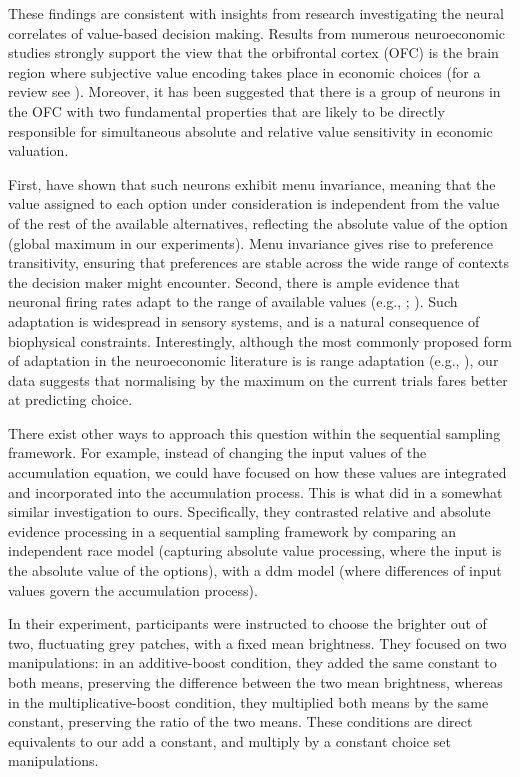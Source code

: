 \documentclass[11pt,a4paper]{article}
\begin{document}
These findings are consistent with insights from research investigating the neural correlates of value-based decision making. Results from numerous neuroeconomic studies strongly support the view that the orbifrontal cortex (OFC) is the brain region where subjective value encoding takes place in economic choices (for a review see ). Moreover, it has been suggested that there is a group of neurons in the OFC with two fundamental properties that are likely to be directly responsible for simultaneous absolute and relative value sensitivity in economic valuation.

First,  have shown that such neurons exhibit menu invariance, meaning that the value assigned to each option under consideration is independent from the value of the rest of the available alternatives, reflecting the absolute value of the option (global maximum in our experiments). Menu invariance gives rise to preference transitivity, ensuring that preferences are stable across the wide range of contexts the decision maker might encounter. Second, there is ample evidence that neuronal firing rates adapt to the range of available values (e.g., ; ). Such adaptation is widespread in sensory systems, and is a natural consequence of biophysical constraints. Interestingly, although the most commonly proposed form of adaptation in the neuroeconomic literature is is range adaptation (e.g., ), our data suggests that normalising by the maximum on the current trials fares better at predicting choice.

There exist other ways to approach this question within the sequential sampling framework. For example, instead of changing the input values of the accumulation equation, we could have focused on how these values are integrated and incorporated into the accumulation process. This is what  did in a somewhat similar investigation to ours. Specifically, they contrasted relative and absolute evidence processing in a sequential sampling framework by comparing an independent race model (capturing absolute value processing, where the input is the absolute value of the options), with a ddm model (where differences of input values govern the accumulation process). 

In their experiment, participants were instructed to choose the brighter out of two, fluctuating grey patches, with a fixed mean brightness. They focused on two manipulations: in an additive-boost condition, they added the same constant to both means, preserving the difference between the two mean brightness, whereas in the multiplicative-boost condition, they multiplied both means by the same constant, preserving the ratio of the two means. These conditions are direct equivalents to our add a constant, and multiply by a constant choice set manipulations.
\end{document}
